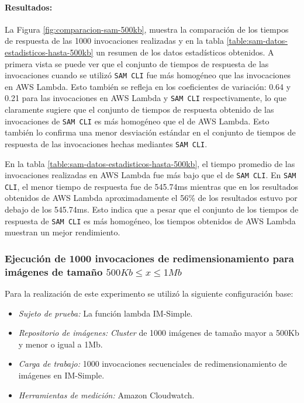 \paragraph{Resultados:} La Figura \ref{fig:comparacion-sam-500kb}, muestra la comparación de los tiempos de respuesta de las 1000 invocaciones realizadas y en la tabla \ref{table:sam-datos-estadisticos-hasta-500kb} un resumen de los datos estadísticos obtenidos. A primera vista se puede ver que el conjunto de tiempos de respuesta de las invocaciones cuando se utilizó \texttt{SAM CLI} fue más homogéneo que las invocaciones en AWS Lambda. Esto también se refleja en los coeficientes de variación: 0.64 y 0.21 para las invocaciones en AWS Lambda y \texttt{SAM CLI} respectivamente, lo que claramente sugiere que el conjunto de tiempos de respuesta obtenido de las invocaciones de \texttt{SAM CLI} es más homogéneo que el de AWS Lambda. Esto también lo confirma una menor desviación estándar en el conjunto de tiempos de respuesta de las invocaciones hechas mediantes \texttt{SAM CLI}. 

En la tabla \ref{table:sam-datos-estadisticos-hasta-500kb}, el tiempo promedio de las invocaciones realizadas en AWS Lambda fue más bajo que el de \texttt{SAM CLI}. En \texttt{SAM CLI}, el menor tiempo de respuesta fue de 545.74ms mientras que en los resultados obtenidos de AWS Lambda aproximadamente el 56\% de los resultados estuvo por debajo de los 545.74ms. Esto indica que a pesar que el conjunto de los tiempos de respuesta de \texttt{SAM CLI} es más homogéneo, los tiempos obtenidos de AWS Lambda muestran un mejor rendimiento.

\subsubsection{Ejecución de 1000 invocaciones de redimensionamiento para imágenes de tamaño $500Kb \leq x \leq 1Mb$}

Para la realización de este experimento se utilizó la siguiente configuración base:
\begin{itemize}
    \item \emph{Sujeto de prueba:} La función lambda IM-Simple.
    \item \emph{Repositorio de imágenes:} \emph{Cluster} de 1000 imágenes de tamaño mayor a 500Kb y menor o igual a 1Mb.
    \item \emph{Carga de trabajo:} 1000 invocaciones secuenciales de redimensionamiento de imágenes en IM-Simple.
    \item \emph{Herramientas de medición:} Amazon Cloudwatch.
\end{itemize}

